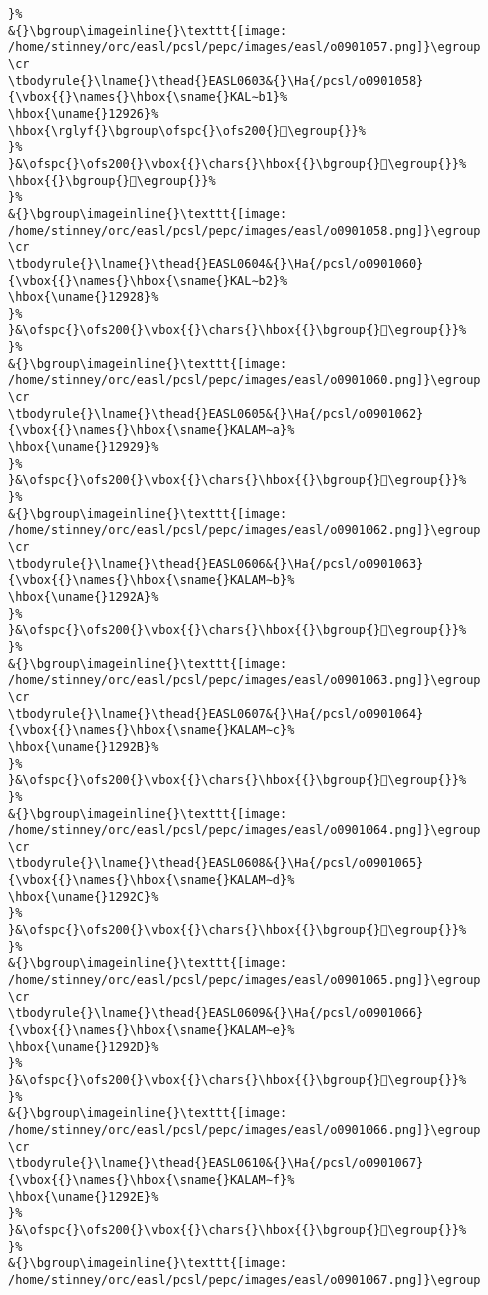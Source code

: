 \begin{verbatim}
}%
&{}\bgroup\imageinline{}\texttt{[image: /home/stinney/orc/easl/pcsl/pepc/images/easl/o0901057.png]}\egroup
\cr
\tbodyrule{}\lname{}\thead{}EASL0603&{}\Ha{/pcsl/o0901058}{\vbox{{}\names{}\hbox{\sname{}KAL∼b1}%
\hbox{\uname{}12926}%
\hbox{\rglyf{}\bgroup\ofspc{}\ofs200{}𒤦\egroup{}}%
}%
}&\ofspc{}\ofs200{}\vbox{{}\chars{}\hbox{{}\bgroup{}𒤦\egroup{}}%
\hbox{{}\bgroup{}𒤧\egroup{}}%
}%
&{}\bgroup\imageinline{}\texttt{[image: /home/stinney/orc/easl/pcsl/pepc/images/easl/o0901058.png]}\egroup
\cr
\tbodyrule{}\lname{}\thead{}EASL0604&{}\Ha{/pcsl/o0901060}{\vbox{{}\names{}\hbox{\sname{}KAL∼b2}%
\hbox{\uname{}12928}%
}%
}&\ofspc{}\ofs200{}\vbox{{}\chars{}\hbox{{}\bgroup{}𒤨\egroup{}}%
}%
&{}\bgroup\imageinline{}\texttt{[image: /home/stinney/orc/easl/pcsl/pepc/images/easl/o0901060.png]}\egroup
\cr
\tbodyrule{}\lname{}\thead{}EASL0605&{}\Ha{/pcsl/o0901062}{\vbox{{}\names{}\hbox{\sname{}KALAM∼a}%
\hbox{\uname{}12929}%
}%
}&\ofspc{}\ofs200{}\vbox{{}\chars{}\hbox{{}\bgroup{}𒤩\egroup{}}%
}%
&{}\bgroup\imageinline{}\texttt{[image: /home/stinney/orc/easl/pcsl/pepc/images/easl/o0901062.png]}\egroup
\cr
\tbodyrule{}\lname{}\thead{}EASL0606&{}\Ha{/pcsl/o0901063}{\vbox{{}\names{}\hbox{\sname{}KALAM∼b}%
\hbox{\uname{}1292A}%
}%
}&\ofspc{}\ofs200{}\vbox{{}\chars{}\hbox{{}\bgroup{}𒤪\egroup{}}%
}%
&{}\bgroup\imageinline{}\texttt{[image: /home/stinney/orc/easl/pcsl/pepc/images/easl/o0901063.png]}\egroup
\cr
\tbodyrule{}\lname{}\thead{}EASL0607&{}\Ha{/pcsl/o0901064}{\vbox{{}\names{}\hbox{\sname{}KALAM∼c}%
\hbox{\uname{}1292B}%
}%
}&\ofspc{}\ofs200{}\vbox{{}\chars{}\hbox{{}\bgroup{}𒤫\egroup{}}%
}%
&{}\bgroup\imageinline{}\texttt{[image: /home/stinney/orc/easl/pcsl/pepc/images/easl/o0901064.png]}\egroup
\cr
\tbodyrule{}\lname{}\thead{}EASL0608&{}\Ha{/pcsl/o0901065}{\vbox{{}\names{}\hbox{\sname{}KALAM∼d}%
\hbox{\uname{}1292C}%
}%
}&\ofspc{}\ofs200{}\vbox{{}\chars{}\hbox{{}\bgroup{}𒤬\egroup{}}%
}%
&{}\bgroup\imageinline{}\texttt{[image: /home/stinney/orc/easl/pcsl/pepc/images/easl/o0901065.png]}\egroup
\cr
\tbodyrule{}\lname{}\thead{}EASL0609&{}\Ha{/pcsl/o0901066}{\vbox{{}\names{}\hbox{\sname{}KALAM∼e}%
\hbox{\uname{}1292D}%
}%
}&\ofspc{}\ofs200{}\vbox{{}\chars{}\hbox{{}\bgroup{}𒤭\egroup{}}%
}%
&{}\bgroup\imageinline{}\texttt{[image: /home/stinney/orc/easl/pcsl/pepc/images/easl/o0901066.png]}\egroup
\cr
\tbodyrule{}\lname{}\thead{}EASL0610&{}\Ha{/pcsl/o0901067}{\vbox{{}\names{}\hbox{\sname{}KALAM∼f}%
\hbox{\uname{}1292E}%
}%
}&\ofspc{}\ofs200{}\vbox{{}\chars{}\hbox{{}\bgroup{}𒤮\egroup{}}%
}%
&{}\bgroup\imageinline{}\texttt{[image: /home/stinney/orc/easl/pcsl/pepc/images/easl/o0901067.png]}\egroup

\end{verbatim}
